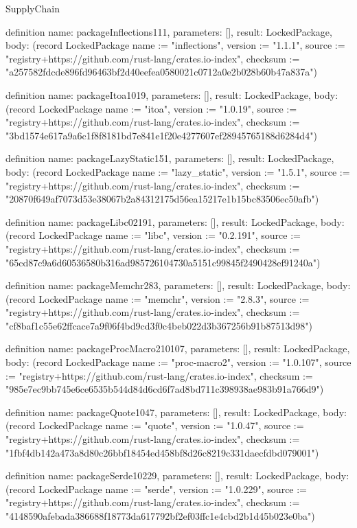 \begin{lexlean}{SupplyChain}
\begin{semanticmodule}
definition{
  name: packageInflections111,
  parameters: [],
  result: LockedPackage,
  body: (record LockedPackage {name := "inflections", version := "1.1.1", source := "registry+https://github.com/rust-lang/crates.io-index", checksum := "a257582fdcde896fd96463bf2d40eefea0580021c0712a0e2b028b60b47a837a"})
}

definition{
  name: packageItoa1019,
  parameters: [],
  result: LockedPackage,
  body: (record LockedPackage {name := "itoa", version := "1.0.19", source := "registry+https://github.com/rust-lang/crates.io-index", checksum := "3bd1574e617a9a6c1f8f8181bd7e841e1f20e4277607ef28945765188d6284d4"})
}

definition{
  name: packageLazyStatic151,
  parameters: [],
  result: LockedPackage,
  body: (record LockedPackage {name := "lazy_static", version := "1.5.1", source := "registry+https://github.com/rust-lang/crates.io-index", checksum := "20870f649af7073d53e38067b2a84312175d56ea15217e1b15bc83506ec50afb"})
}

definition{
  name: packageLibc02191,
  parameters: [],
  result: LockedPackage,
  body: (record LockedPackage {name := "libc", version := "0.2.191", source := "registry+https://github.com/rust-lang/crates.io-index", checksum := "65cd87c9a6d60536580b316ad985726104730a5151c99845f2490428ef91240a"})
}

definition{
  name: packageMemchr283,
  parameters: [],
  result: LockedPackage,
  body: (record LockedPackage {name := "memchr", version := "2.8.3", source := "registry+https://github.com/rust-lang/crates.io-index", checksum := "cf8baf1c55e62ffcace7a9f06f4bd9cd3f0c4beb022d3b367256b91b87513d98"})
}

definition{
  name: packageProcMacro210107,
  parameters: [],
  result: LockedPackage,
  body: (record LockedPackage {name := "proc-macro2", version := "1.0.107", source := "registry+https://github.com/rust-lang/crates.io-index", checksum := "985e7ec9bb745e6ce6535b544d84d6cd6f7ad8bd711c398938ae983b91a766d9"})
}

definition{
  name: packageQuote1047,
  parameters: [],
  result: LockedPackage,
  body: (record LockedPackage {name := "quote", version := "1.0.47", source := "registry+https://github.com/rust-lang/crates.io-index", checksum := "1fbf4db142a473a8d80c26bbf18454ed458bf8d26c8219c331daecfdbd079001"})
}

definition{
  name: packageSerde10229,
  parameters: [],
  result: LockedPackage,
  body: (record LockedPackage {name := "serde", version := "1.0.229", source := "registry+https://github.com/rust-lang/crates.io-index", checksum := "4148590afebada386688f18773da617792bf2ef03ffc1e4cbd2b1d45b023e0ba"})
}


\end{semanticmodule}
\end{lexlean}
